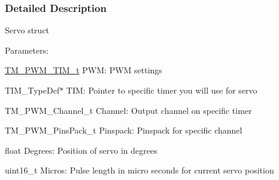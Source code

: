 \subsubsection{Detailed Description}
Servo struct

Parameters\+:
\begin{DoxyItemize}
\item \hyperlink{struct_t_m___p_w_m___t_i_m__t}{T\+M\+\_\+\+P\+W\+M\+\_\+\+T\+I\+M\+\_\+t} P\+W\+M\+: P\+W\+M settings
\item T\+I\+M\+\_\+\+Type\+Def$\ast$ T\+I\+M\+: Pointer to specific timer you will use for servo
\item T\+M\+\_\+\+P\+W\+M\+\_\+\+Channel\+\_\+t Channel\+: Output channel on specific timer
\item T\+M\+\_\+\+P\+W\+M\+\_\+\+Pins\+Pack\+\_\+t Pinspack\+: Pinspack for specific channel
\end{DoxyItemize}

float Degrees\+: Position of servo in degrees
\begin{DoxyItemize}
\item uint16\+\_\+t Micros\+: Pulse length in micro seconds for current servo position 
\end{DoxyItemize}